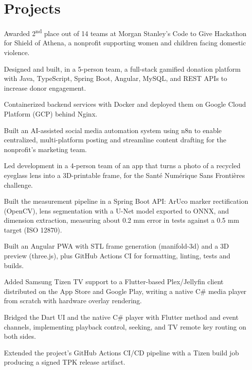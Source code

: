 \documentclass[letterpaper,10pt]{article}
\begin{document}
\section{Projects}

\begin{resume_list}
\item Awarded 2\textsuperscript{nd} place out of 14 teams at Morgan Stanley's Code to Give Hackathon for Shield of Athena, a nonprofit supporting women and children facing domestic violence.
\item Designed and built, in a 5-person team, a full-stack gamified donation platform with Java, TypeScript, Spring Boot, Angular, MySQL, and REST APIs to increase donor engagement.
\item Containerized backend services with Docker and deployed them on Google Cloud Platform (GCP) behind Nginx.
\item Built an AI-assisted social media automation system using n8n to enable centralized, multi-platform posting and streamline content drafting for the nonprofit's marketing team.
\end{resume_list}

\newpage

\begin{resume_list}
\item Led development in a 4-person team of an app that turns a photo of a recycled eyeglass lens into a 3D-printable frame, for the Santé Numérique Sans Frontières challenge.
\item Built the measurement pipeline in a Spring Boot API: ArUco marker rectification (OpenCV), lens segmentation with a U-Net model exported to ONNX, and dimension extraction, measuring about 0.2 mm error in tests against a 0.5 mm target (ISO 12870).
\item Built an Angular PWA with STL frame generation (manifold-3d) and a 3D preview (three.js), plus GitHub Actions CI for formatting, linting, tests and builds.
\end{resume_list}

\begin{resume_list}
\item Added Samsung Tizen TV support to a Flutter-based Plex/Jellyfin client distributed on the App Store and Google Play, writing a native C\# media player from scratch with hardware overlay rendering.
\item Bridged the Dart UI and the native C\# player with Flutter method and event channels, implementing playback control, seeking, and TV remote key routing on both sides.
\item Extended the project's GitHub Actions CI/CD pipeline with a Tizen build job producing a signed TPK release artifact.
\end{resume_list}
\end{document}
